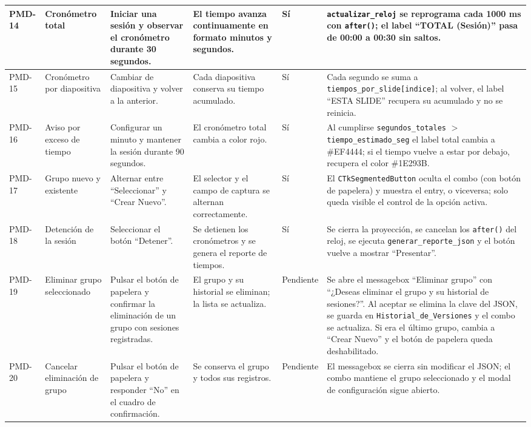 \documentclass[12pt,letterpaper]{article}
\begin{document}
{\begin{longtable}{|L{1.1cm}|L{2.3cm}|L{3.2cm}|L{3.6cm}|L{1.2cm}|L{3.6cm}|}
PMD-14 & Cronómetro total & Iniciar una sesión y observar el cronómetro durante 30 segundos. & El tiempo avanza continuamente en formato minutos y segundos. & Sí & \texttt{actualizar\_reloj} se reprograma cada 1000 ms con \texttt{after()}; el label ``TOTAL (Sesión)'' pasa de 00:00 a 00:30 sin saltos. \\ \hline
PMD-15 & Cronómetro por diapositiva & Cambiar de diapositiva y volver a la anterior. & Cada diapositiva conserva su tiempo acumulado. & Sí & Cada segundo se suma a \texttt{tiempos\_por\_slide[indice]}; al volver, el label ``ESTA SLIDE'' recupera su acumulado y no se reinicia. \\ \hline
PMD-16 & Aviso por exceso de tiempo & Configurar un minuto y mantener la sesión durante 90 segundos. & El cronómetro total cambia a color rojo. & Sí & Al cumplirse \texttt{segundos\_totales} $>$ \texttt{tiempo\_estimado\_seg} el label total cambia a \#EF4444; si el tiempo vuelve a estar por debajo, recupera el color \#1E293B. \\ \hline
PMD-17 & Grupo nuevo y existente & Alternar entre ``Seleccionar'' y ``Crear Nuevo''. & El selector y el campo de captura se alternan correctamente. & Sí & El \texttt{CTkSegmentedButton} oculta el combo (con botón de papelera) y muestra el entry, o viceversa; solo queda visible el control de la opción activa. \\ \hline
PMD-18 & Detención de la sesión & Seleccionar el botón ``Detener''. & Se detienen los cronómetros y se genera el reporte de tiempos. & Sí & Se cierra la proyección, se cancelan los \texttt{after()} del reloj, se ejecuta \texttt{generar\_reporte\_json} y el botón vuelve a mostrar ``Presentar''. \\ \hline
PMD-19 & Eliminar grupo seleccionado & Pulsar el botón de papelera y confirmar la eliminación de un grupo con sesiones registradas. & El grupo y su historial se eliminan; la lista se actualiza. & Pendiente & Se abre el messagebox ``Eliminar grupo'' con ``¿Deseas eliminar el grupo y su historial de sesiones?''. Al aceptar se elimina la clave del JSON, se guarda en \texttt{Historial\_de\_Versiones} y el combo se actualiza. Si era el último grupo, cambia a ``Crear Nuevo'' y el botón de papelera queda deshabilitado. \\ \hline
PMD-20 & Cancelar eliminación de grupo & Pulsar el botón de papelera y responder ``No'' en el cuadro de confirmación. & Se conserva el grupo y todos sus registros. & Pendiente & El messagebox se cierra sin modificar el JSON; el combo mantiene el grupo seleccionado y el modal de configuración sigue abierto. \\ \hline

\end{longtable}}
\end{document}
